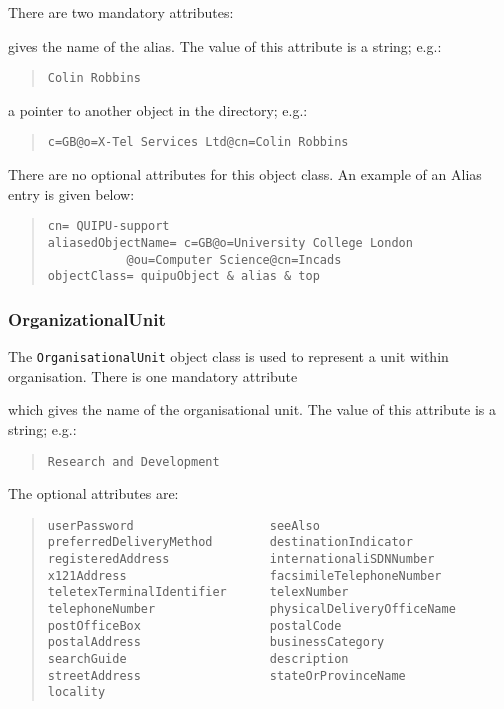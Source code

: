 There are two mandatory attributes:
\begin{describe}
\item[\verb+commonName+:]	gives the name of the alias.
			The value of this attribute is a string; e.g.:
\begin{quote}\small\begin{verbatim}
Colin Robbins
\end{verbatim}\end{quote}

\item[\verb+aliasedObjectName+:] a pointer to another object in the directory;
			e.g.:
\begin{quote}\small\begin{verbatim}
c=GB@o=X-Tel Services Ltd@cn=Colin Robbins
\end{verbatim}\end{quote}
\end{describe}
There are no optional attributes for this object class.
An example of an Alias entry is given below:
\begin{quote}\small\begin{verbatim}
cn= QUIPU-support
aliasedObjectName= c=GB@o=University College London
		   @ou=Computer Science@cn=Incads
objectClass= quipuObject & alias & top
\end{verbatim}\end{quote}

\subsubsection{OrganizationalUnit}
The \verb+OrganisationalUnit+ object class is used to represent a unit within
organisation.
There is one mandatory attribute
\begin{describe}
\item[\verb+organizationalUnitName+:]
			which gives the name of the organisational unit.
			The value of this attribute is a string; e.g.:
\begin{quote}\small\begin{verbatim}
Research and Development
\end{verbatim}\end{quote}
\end{describe}

The optional attributes are:
\begin{quote}\small\begin{verbatim}
userPassword                   seeAlso
preferredDeliveryMethod        destinationIndicator
registeredAddress              internationaliSDNNumber
x121Address                    facsimileTelephoneNumber
teletexTerminalIdentifier      telexNumber
telephoneNumber                physicalDeliveryOfficeName
postOfficeBox                  postalCode
postalAddress                  businessCategory
searchGuide                    description
streetAddress                  stateOrProvinceName
locality
\end{verbatim}\end{quote}


